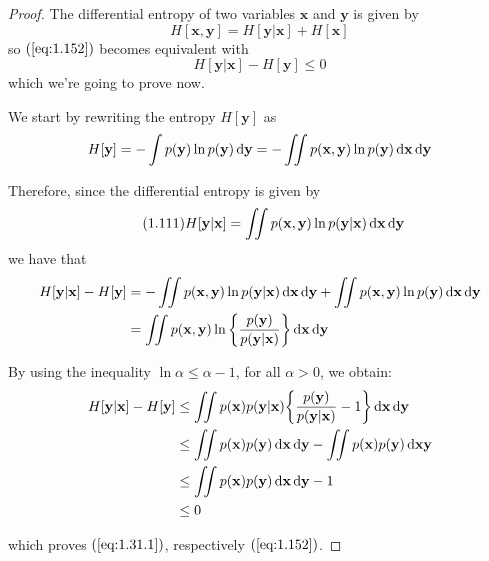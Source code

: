 \vspace{1em}

\begin{proof}
    The differential entropy of two variables $\mathbf{x}$ and  $\mathbf{y}$
    is given by 
    \begin{equation}\label{eq:1.112}\tag{1.112}
        H[\mathbf{x}, \mathbf{y}] = H[\mathbf{y} | \mathbf{x}] + H[\mathbf{x}]
    \end{equation}
    so $(\ref{eq:1.152})$ becomes equivalent with
    \begin{equation}\label{eq:1.31.1}\tag{1.31.1}
        H[\mathbf{y} | \mathbf{x}] - H[\mathbf{y}] \leq 0
    \end{equation}
    which we're going to prove now. 

    We start by rewriting the entropy $H[\mathbf{y}]$ as
    \[
        H[\mathbf{y}] 
        = -\int p(\mathbf{y}) \ln p(\mathbf{y}) \mathop{}\!\mathrm{d} \mathbf{y}
        = -\iint p(\mathbf{x}, \mathbf{y}) \ln p(\mathbf{y}) \mathop{}\!\mathrm{d} \mathbf{x} \mathop{}\!\mathrm{d} \mathbf{y}
    \] 

    Therefore, since the differential entropy is given by
    \begin{equation}\label{eq:1.111}\tag{1.111}
        H[\mathbf{y} | \mathbf{x}] 
        = \iint p(\mathbf{x}, \mathbf{y}) \ln p(\mathbf{y} | \mathbf{x}) \mathop{}\!\mathrm{d} \mathbf{x} \mathop{}\!\mathrm{d} \mathbf{y}
    \end{equation}
    we have that
    \begin{align*}
         H[\mathbf{y} | \mathbf{x}] - H[\mathbf{y}] 
        &= -\iint p(\mathbf{x}, \mathbf{y}) \ln p(\mathbf{y} | \mathbf{x}) \mathop{}\!\mathrm{d} \mathbf{x} \mathop{}\!\mathrm{d} \mathbf{y}
        + \iint p(\mathbf{x}, \mathbf{y}) \ln p(\mathbf{y}) \mathop{}\!\mathrm{d} \mathbf{x} \mathop{}\!\mathrm{d} \mathbf{y} \\
        &= \iint p(\mathbf{x}, \mathbf{y}) \ln \bigg\{ \frac{p(\mathbf{y})}{p(\mathbf{y}|\mathbf{x})}\bigg\}
        \mathop{}\!\mathrm{d} \mathbf{x} \mathop{}\!\mathrm{d} \mathbf{y}
    \end{align*}

    By using the inequality $\ln \alpha \leq \alpha - 1$, for all $\alpha > 0$, we obtain:
    \begin{align*}
         H[\mathbf{y} | \mathbf{x}] - H[\mathbf{y}] 
        &\leq \iint p(\mathbf{x}) p(\mathbf{y} | \mathbf{x}) \bigg\{\frac{p(\mathbf{y})}{p(\mathbf{y} | \mathbf{x})} - 1\bigg\}
        \mathop{}\!\mathrm{d} \mathbf{x} \mathop{}\!\mathrm{d} \mathbf{y} \\
        &\leq \iint p(\mathbf{x}) p(\mathbf{y}) \mathop{}\!\mathrm{d} \mathbf{x} \mathop{}\!\mathrm{d} \mathbf{y} 
        - \iint p(\mathbf{x}) p(\mathbf{y}) \mathop{}\!\mathrm{d} \mathbf{x} \mathbf{y} \\
        &\leq \iint p(\mathbf{x}) p(\mathbf{y}) \mathop{}\!\mathrm{d} \mathbf{x} \mathop{}\!\mathrm{d} \mathbf{y}  - 1 \\
        &\leq 0
    \end{align*}

    which proves $(\ref{eq:1.31.1})$, respectively $(\ref{eq:1.152})$.
\end{proof}

